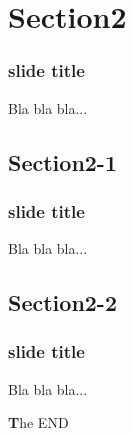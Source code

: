 \documentclass[slidestop,compress,9pt]{beamer}
\begin{document}
\section{Section2}
\begin{frame}
\frametitle{slide title}
Bla bla bla...
\end{frame}

\subsection{Section2-1}
\begin{frame}
\frametitle{slide title}
Bla bla bla...
\end{frame}

\subsection{Section2-2}
\begin{frame}
\frametitle{slide title}
Bla bla bla...
\end{frame}


\begin{frame}
\noframetitle
\vskip 20mm

\begin{center}
{\Huge {\color{slidetitles} \textbf The END}}


\begin{minipage}{0.8\textwidth}
\end{minipage}
\end{center}
\end{frame}





\end{document}
